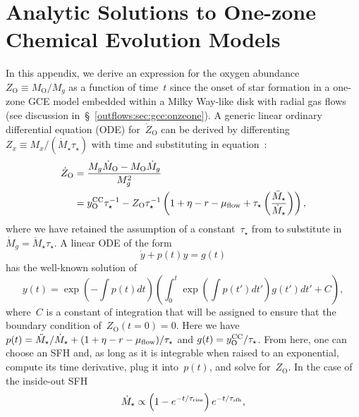 \documentclass[main.tex]{subfiles}
\begin{document}
\chapter{Analytic Solutions to One-zone Chemical Evolution Models}
\label{outflows:sec:gce-supplement}

In this appendix, we derive an expression for the oxygen abundance
$Z_\text{O} \equiv M_\text{O} / M_g$ as a function of time~$t$ since the onset
of star formation in a one-zone GCE model embedded within a Milky Way-like
disk with radial gas flows
(see discussion in~\S~\ref{outflows:sec:gce:onzeone}).
A generic linear ordinary differential equation (ODE) for~$\dot{Z}_\text{O}$
can be derived by differenting~$Z_x \equiv M_x / (\dot{M}_\star \tau_\star)$
with time and substituting in equation~:
\begin{equation}\begin{split}
\dot{Z}_\text{O} &= \frac{M_g \dot{M}_\text{O} - M_\text{O} \dot{M}_g}{M_g^2}
\\
&= y_\text{O}^\text{CC} \tau_\star^{-1} - Z_\text{O} \tau_\star^{-1}
\left(1 + \eta - r - \mu_{\text{flow}} + \tau_\star \left(
\frac{\ddot{M}_\star}{\dot{M}_\star}
\right)\right),
\label{outflows:eq:generic-linear-ode}
\end{split}\end{equation}
where we have retained the assumption of a constant~$\tau_\star$ from
\citet{Weinberg2017b} to substitute in~$\dot{M}_g = \ddot{M}_\star \tau_\star$.
A linear ODE of the form
\begin{equation}
\dot{y} + p(t) y = g(t)
\end{equation}
has the well-known solution of
\begin{equation}
y(t) = \exp\left(-\int p(t) dt\right)
\left(\int_0^t \exp\left(\int p(t') dt'\right) g(t') dt' + C\right),
\label{outflows:eq:linear-ode-formula}
\end{equation}
where~$C$ is a constant of integration that will be assigned to ensure that
the boundary condition of~$Z_\text{O}(t = 0) = 0$.
Here we have~$p(t) = \ddot{M}_\star / \dot{M}_\star + (1 + \eta - r -
\mu_{\text{flow}}) / \tau_\star$ and $g(t) = y_\text{O}^\text{CC} / \tau_\star$.
From here, one can choose an SFH and, as long as it is integrable when raised
to an exponential, compute its time derivative, plug it into~$p(t)$, and solve
for~$Z_\text{O}$.
In the case of the inside-out SFH
\begin{equation}
\dot{M}_\star \propto \left(1 - e^{-t / \tau_\text{rise}}\right)
e^{-t / \tau_\text{sfh}},
\end{equation}
\end{document}
